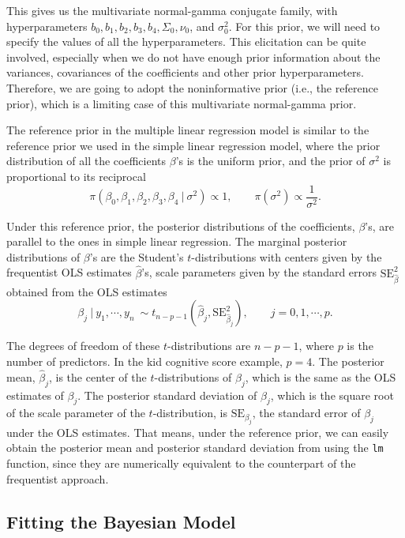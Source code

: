 \documentclass[]{book}
\theoremstyle{definition}
\theoremstyle{definition}
\theoremstyle{definition}
\theoremstyle{remark}
\begin{document}
This gives us the multivariate normal-gamma conjugate family, with
hyperparameters \(b_0, b_1, b_2, b_3, b_4, \Sigma_0, \nu_0\), and
\(\sigma_0^2\). For this prior, we will need to specify the values of
all the hyperparameters. This elicitation can be quite involved,
especially when we do not have enough prior information about the
variances, covariances of the coefficients and other prior
hyperparameters. Therefore, we are going to adopt the noninformative
prior (i.e., the reference prior), which is a limiting case of this
multivariate normal-gamma prior.

The reference prior in the multiple linear regression model is similar
to the reference prior we used in the simple linear regression model,
where the prior distribution of all the coefficients \(\beta\)'s is the
uniform prior, and the prior of \(\sigma^2\) is proportional to its
reciprocal
\[ \pi(\beta_0,\beta_1,\beta_2,\beta_3,\beta_4~|~\sigma^2) \propto 1,\qquad \pi(\sigma^2) \propto \frac{1}{\sigma^2}. \]

Under this reference prior, the posterior distributions of the
coefficients, \(\beta\)'s, are parallel to the ones in simple linear
regression. The marginal posterior distributions of \(\beta\)'s are the
Student's \(t\)-distributions with centers given by the frequentist OLS
estimates \(\hat{\beta}\)'s, scale parameters given by the standard
errors \(\text{SE}_{\hat{\beta}}^2\) obtained from the OLS estimates \[
\beta_j~|~y_1,\cdots,y_n\ \sim t_{n-p-1}(\hat{\beta}_j, \text{SE}_{\hat{\beta}_j}^2),\qquad j = 0, 1, \cdots, p.
\]

The degrees of freedom of these \(t\)-distributions are \(n-p-1\), where
\(p\) is the number of predictors. In the kid cognitive score example,
\(p=4\). The posterior mean, \(\hat{\beta}_j\), is the center of the
\(t\)-distributions of \(\beta_j\), which is the same as the OLS
estimates of \(\beta_j\). The posterior standard deviation of
\(\beta_j\), which is the square root of the scale parameter of the
\(t\)-distribution, is \(\text{SE}_{\beta_j}\), the standard error of
\(\beta_j\) under the OLS estimates. That means, under the reference
prior, we can easily obtain the posterior mean and posterior standard
deviation from using the \texttt{lm} function, since they are
numerically equivalent to the counterpart of the frequentist approach.

\subsection{Fitting the Bayesian
Model}\label{fitting-the-bayesian-model}
\end{document}
